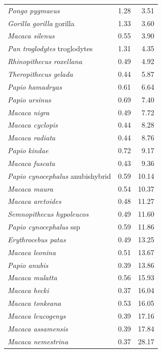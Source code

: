 \begin{center}
\begin{longtable}{l r r}
        \textit{Pongo pygmaeus} & 1.28 & 3.51 \\
        \textit{Gorilla gorilla} gorilla & 1.33 & 3.60 \\
        \textit{Macaca silenus} & 0.55 & 3.90 \\
        \textit{Pan troglodytes} troglodytes & 1.31 & 4.35 \\
        \textit{Rhinopithecus roxellana} & 0.49 & 4.92 \\
        \textit{Theropithecus gelada} & 0.44 & 5.87 \\
        \textit{Papio hamadryas} & 0.61 & 6.64 \\
        \textit{Papio ursinus} & 0.69 & 7.40 \\
        \textit{Macaca nigra} & 0.49 & 7.72 \\
        \textit{Macaca cyclopis} & 0.44 & 8.28 \\
        \textit{Macaca radiata} & 0.44 & 8.76 \\
        \textit{Papio kindae} & 0.72 & 9.17 \\
        \textit{Macaca fuscata} & 0.43 & 9.36 \\
        \textit{Papio cynocephalus} anubishybrid & 0.59 & 10.14 \\
        \textit{Macaca maura} & 0.54 & 10.37 \\
        \textit{Macaca arctoides} & 0.48 & 11.27 \\
        \textit{Semnopithecus hypoleucos} & 0.49 & 11.60 \\
        \textit{Papio cynocephalus} ssp & 0.59 & 11.86 \\
        \textit{Erythrocebus patas} & 0.49 & 13.25 \\
        \textit{Macaca leonina} & 0.51 & 13.67 \\
        \textit{Papio anubis} & 0.39 & 13.86 \\
        \textit{Macaca mulatta} & 0.56 & 15.93 \\
        \textit{Macaca hecki} & 0.37 & 16.04 \\
        \textit{Macaca tonkeana} & 0.53 & 16.05 \\
        \textit{Macaca leucogenys} & 0.39 & 17.16 \\
        \textit{Macaca assamensis} & 0.39 & 17.84 \\
        \textit{Macaca nemestrina} & 0.37 & 28.17 \\
    \end{longtable}
\end{center}
